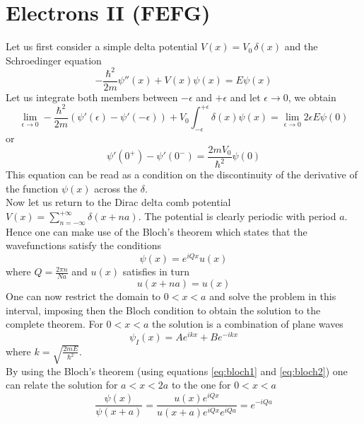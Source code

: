 \documentclass{article}
\begin{document}
\newpage

\section{Electrons II (FEFG)}

Let us first consider a simple delta potential $V(x) = V_0 \, \delta(x)$ and the Schroedinger equation 
\begin{equation*}
    -\frac{\hbar^2}{2m}\psi''(x) + V(x) \psi(x) = E \psi(x)
\end{equation*}
Let us integrate both members between $-\epsilon$ and $+\epsilon$ and let $\epsilon \to 0$, we obtain 
\begin{equation*}
    \lim_{\epsilon \to 0} -\frac{\hbar^2}{2m} \left(\psi'(\epsilon) - \psi'(-\epsilon)\right) + V_0\int_{-\epsilon}^{+\epsilon} \delta(x) \psi(x) = \lim_{\epsilon \to 0} 2\epsilon E \psi(0)
\end{equation*} 
or 
\begin{equation*}
    \psi'(0^+) - \psi'(0^-) = \frac{2mV_0}{\hbar^2}\psi(0)
\end{equation*}
This equation can be read as a condition on the discontinuity of the derivative of the function $\psi(x)$ across the $\delta$. \\
Now let us return to the Dirac delta comb potential $V(x) = \sum_{n=-\infty}^{+\infty} \delta(x+na)$. The potential is clearly periodic with period $a$. Hence
one can make use of the Bloch's theorem which states that the wavefunctions satisfy the conditions
\begin{equation}
    \psi(x) = e^{iQx} u(x)
    \label{eq:bloch1}
\end{equation}
where $Q=\frac{2\pi n}{Na}$ and $u(x)$ satisfies in turn
\begin{equation}
    u(x+na) = u(x)
    \label{eq:bloch2}
\end{equation}
One can now restrict the domain to $0<x<a$ and solve the problem in this interval, imposing then the Bloch condition to obtain the solution 
to the complete theorem. For $0<x<a$ the solution is a combination of plane waves
\begin{equation*}
    \psi_I(x) = Ae^{ikx} + Be^{-ikx}
\end{equation*}
where $k = \sqrt{\frac{2mE}{\hbar^2}}$. \\
By using the Bloch's theorem (using equations \ref{eq:bloch1} and \ref{eq:bloch2}) one can relate the solution for $a<x<2a$ to the one for $0<x<a$
\begin{equation*}
    \frac{\psi(x)}{\psi(x+a)} = \frac{u(x)e^{iQx}}{u(x+a)e^{iQx}e^{iQa}} = e^{-iQa}
\end{equation*}
\end{document}
